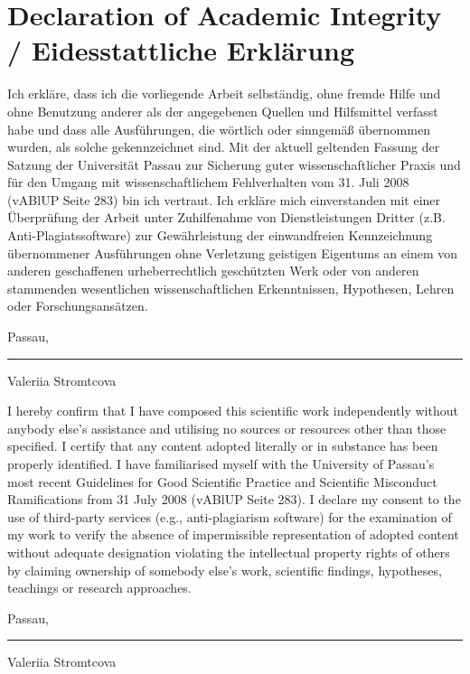 

\chapter*{Declaration of Academic Integrity / Eidesstattliche Erkl\"arung}

Ich erkläre, dass ich die vorliegende Arbeit selbständig, ohne fremde Hilfe und ohne Benutzung anderer als der angegebenen Quellen und Hilfsmittel verfasst habe und dass alle Ausführungen, die wörtlich oder sinngemäß übernommen wurden, als solche gekennzeichnet sind. Mit der aktuell geltenden Fassung der Satzung der Universität Passau zur Sicherung guter wissenschaftlicher Praxis und für den Umgang mit wissenschaftlichem Fehlverhalten vom 31. Juli 2008 (vABlUP Seite 283) bin ich vertraut. Ich erkläre mich einverstanden mit einer Überprüfung der Arbeit unter Zuhilfenahme von Dienstleistungen Dritter (z.B. Anti-Plagiatssoftware) zur Gewährleistung der einwandfreien Kennzeichnung übernommener Ausführungen ohne Verletzung geistigen Eigentums an einem von anderen geschaffenen urheberrechtlich geschützten Werk oder von anderen stammenden wesentlichen wissenschaftlichen Erkenntnissen, Hypothesen, Lehren oder Forschungsansätzen.

\vspace{0.5cm}

	Passau, \fttoday

	\vspace{1.5cm}

	\parbox{5cm}{
	\hrule \strut Valeriia Stromtcova}

	\vspace{1cm}


I hereby confirm that I have composed this scientific work independently without anybody else’s assistance and utilising no sources or resources other than those specified. I certify that any content adopted literally or in substance has been properly identified. I have familiarised myself with the University of Passau’s most recent Guidelines for Good Scientific Practice and Scientific Misconduct Ramifications from 31 July 2008 (vABlUP Seite 283). I declare my consent to the use of third-party services (e.g., anti-plagiarism software) for the examination of my work to verify the absence of impermissible representation of adopted content without adequate designation violating the intellectual property rights of others by claiming ownership of somebody else’s work, scientific findings, hypotheses, teachings or research approaches.


\vspace{0.5cm}

	Passau, \fttoday


	\vspace{1.5cm}

	\parbox{5cm}{
	\hrule \strut Valeriia Stromtcova}



